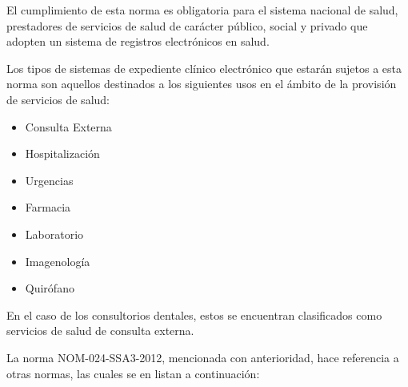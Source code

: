 \vspace{1em}

El cumplimiento de esta norma es obligatoria para el sistema nacional de salud, prestadores de servicios de salud de carácter público, social y privado que adopten un sistema de registros electrónicos en salud.

\vspace{1em}

Los tipos de sistemas de expediente clínico electrónico que estarán sujetos a esta norma son aquellos destinados a los siguientes usos en el ámbito de la provisión de servicios de salud:

\begin{itemize}
\item Consulta Externa
\item Hospitalización
\item Urgencias
\item Farmacia
\item Laboratorio
\item Imagenología
\item Quirófano
\end{itemize}

En el caso de los consultorios dentales, estos se encuentran clasificados como servicios de salud de consulta externa.

La norma NOM-024-SSA3-2012, mencionada con anterioridad, hace referencia a otras normas, las cuales se en listan a continuación:

